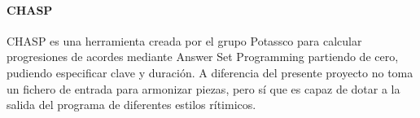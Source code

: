 \paragraph{CHASP}
CHASP es una herramienta creada por el grupo Potassco para calcular progresiones de acordes mediante Answer Set Programming partiendo de cero, pudiendo especificar clave y duración. A diferencia del presente proyecto no toma un fichero de entrada para armonizar piezas, pero sí que es capaz de dotar a la salida del programa de diferentes estilos rítimicos.

